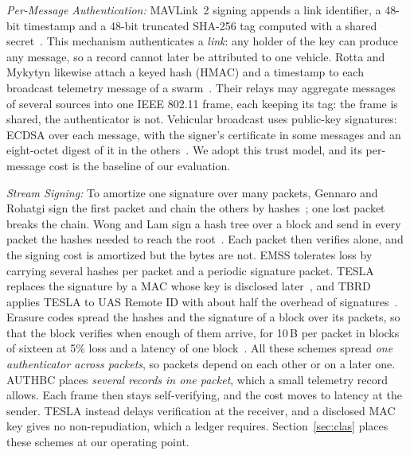 \documentclass[lineno,pdflatex,sn-mathphys-num]{sn-jnl}
\newcommand{\runin}[1]{\textit{#1:}}
\renewcommand{\_}{\authbcunderscore\allowbreak}
\begin{document}
\runin{Per-Message Authentication} MAVLink~2 signing appends a link identifier, a 48-bit
timestamp and a 48-bit truncated SHA-256 tag computed with a shared
secret~\cite{mavlink2signing}. This mechanism authenticates a \emph{link}: any holder of the key
can produce any message, so a record cannot later be attributed to one vehicle. Rotta and
Mykytyn likewise attach a keyed hash (HMAC) and a timestamp to each broadcast telemetry message
of a swarm~\cite{rotta2024telemetrybroadcast}. Their relays may aggregate messages of several
sources into one IEEE 802.11 frame, each keeping its tag: the frame is shared, the authenticator
is not. Vehicular broadcast uses public-key signatures:
ECDSA over each message, with the signer's certificate in some messages and an eight-octet
digest of it in the others~\cite{etsi_ts103097,ndss2024pqv2v}. We adopt this trust model, and
its per-message cost is the baseline of our evaluation.

\runin{Stream Signing} To amortize one signature over many packets, Gennaro and Rohatgi sign
the first packet and chain the others by hashes~\cite{gennaro1997streams}; one lost packet
breaks the chain. Wong and Lam sign a hash tree over a block and send in every packet the hashes
needed to reach the root~\cite{wong1999flows}. Each packet then verifies alone, and the signing
cost is amortized but the bytes are not. EMSS tolerates loss by carrying several hashes per
packet and a periodic signature packet. TESLA replaces the signature by a MAC whose key is
disclosed later~\cite{perrig2000emss,perrig2002tesla}, and TBRD applies
TESLA to UAS Remote ID with about half the overhead of signatures~\cite{veara2025tbrd}. Erasure
codes spread the hashes and the signature of a block over its packets, so that the block
verifies when enough of them arrive, for 10\,B per packet in blocks of sixteen at 5\% loss and a
latency of one block~\cite{pannetrat2003multicast}. All these schemes spread \emph{one
authenticator across packets}, so packets depend on each other or on a later one. AUTHBC
places \emph{several records in one packet}, which a small telemetry record allows. Each frame
then stays self-verifying, and the cost moves to latency at the sender. TESLA instead delays
verification at the receiver, and a disclosed MAC key gives no non-repudiation, which a ledger
requires. Section~\ref{sec:clas} places these schemes at our operating point.
\end{document}
